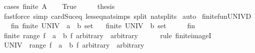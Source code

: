 \begin{isabellebody}
%
\isadelimproof
%
\endisadelimproof
%
\isatagproof
{}\isamarkupfalse%
\ {\isacharparenleft}{\kern0pt}cases\ {\isachardoublequoteopen}finite\ A{\isachardoublequoteclose}{\isacharparenright}{\kern0pt}\isanewline
\ \ \isamarkupfalse%
\ True\isanewline
\ \ \isamarkupfalse%
\ \isamarkupfalse%
\ {\isacharquery}{\kern0pt}thesis\isanewline
\ \ \ \ \isamarkupfalse%
\ {\isacharparenleft}{\kern0pt}fastforce\ simp{\isacharcolon}{\kern0pt}\ card{\isacharunderscore}{\kern0pt}Suc{\isacharunderscore}{\kern0pt}eq\ less{\isacharunderscore}{\kern0pt}eq{\isacharunderscore}{\kern0pt}nat{\isachardot}{\kern0pt}simps\ split{\isacharcolon}{\kern0pt}\ nat{\isachardot}{\kern0pt}splits{\isacharparenright}{\kern0pt}\isanewline
{}\isamarkupfalse%
\ auto%
\endisatagproof
{\isafoldproof}%
%
\isadelimproof
\isanewline
%
\endisadelimproof
\isanewline
{}\isamarkupfalse%
\ finite{\isacharunderscore}{\kern0pt}fun{\isacharunderscore}{\kern0pt}UNIVD{}{\isacharcolon}{\kern0pt}\isanewline
\ \ \ fin{\isacharcolon}{\kern0pt}\ {\isachardoublequoteopen}finite\ {\isacharparenleft}{\kern0pt}UNIV\ {\isacharcolon}{\kern0pt}{\isacharcolon}{\kern0pt}\ {\isacharparenleft}{\kern0pt}{\isacharprime}{\kern0pt}a\ {\isasymRightarrow}\ {\isacharprime}{\kern0pt}b{\isacharparenright}{\kern0pt}\ set{\isacharparenright}{\kern0pt}{\isachardoublequoteclose}\isanewline
\ \ \ {\isachardoublequoteopen}finite\ {\isacharparenleft}{\kern0pt}UNIV\ {\isacharcolon}{\kern0pt}{\isacharcolon}{\kern0pt}\ {\isacharprime}{\kern0pt}b\ set{\isacharparenright}{\kern0pt}{\isachardoublequoteclose}\isanewline
%
\isadelimproof
%
\endisadelimproof
%
\isatagproof
{}\isamarkupfalse%
\ {\isacharminus}{\kern0pt}\isanewline
\ \ \isamarkupfalse%
\ fin\ \isamarkupfalse%
\ {\isachardoublequoteopen}finite\ {\isacharparenleft}{\kern0pt}range\ {\isacharparenleft}{\kern0pt}{\isasymlambda}f\ {\isacharcolon}{\kern0pt}{\isacharcolon}{\kern0pt}\ {\isacharprime}{\kern0pt}a\ {\isasymRightarrow}\ {\isacharprime}{\kern0pt}b{\isachardot}{\kern0pt}\ f\ arbitrary{\isacharparenright}{\kern0pt}{\isacharparenright}{\kern0pt}{\isachardoublequoteclose}\ \ arbitrary\isanewline
\ \ \ \ \isamarkupfalse%
\ {\isacharparenleft}{\kern0pt}rule\ finite{\isacharunderscore}{\kern0pt}imageI{\isacharparenright}{\kern0pt}\isanewline
\ \ \isamarkupfalse%
\ \isamarkupfalse%
\ {\isachardoublequoteopen}UNIV\ {\isacharequal}{\kern0pt}\ range\ {\isacharparenleft}{\kern0pt}{\isasymlambda}f\ {\isacharcolon}{\kern0pt}{\isacharcolon}{\kern0pt}\ {\isacharprime}{\kern0pt}a\ {\isasymRightarrow}\ {\isacharprime}{\kern0pt}b{\isachardot}{\kern0pt}\ f\ arbitrary{\isacharparenright}{\kern0pt}{\isachardoublequoteclose}\ \ arbitrary\isanewline

\end{isabellebody}
